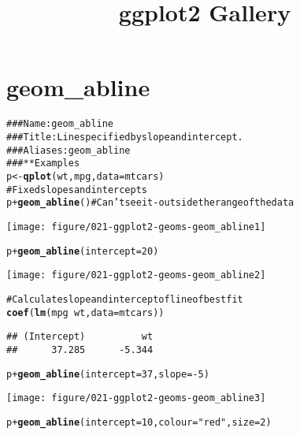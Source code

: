 \documentclass[a4paper,titlepage]{tufte-handout}\usepackage{graphicx, color}
\title{ggplot2 Gallery}
\makeatletter
\def\maxwidth{ %
  \ifdim\Gin@nat@width>\linewidth
    \linewidth
  \else
    \Gin@nat@width
  \fi
}
\newcommand{\hlfunctioncall}[1]{\textcolor[rgb]{0.501960784313725,0,0.329411764705882}{\textbf{#1}}}%
\newcommand{\hlstring}[1]{\textcolor[rgb]{0.6,0.6,1}{#1}}%
\newcommand{\hlcomment}[1]{\textcolor[rgb]{0.180392156862745,0.6,0.341176470588235}{#1}}%
\newenvironment{kframe}{%
 \def\at@end@of@kframe{}%
 \ifinner\ifhmode%
  \def\at@end@of@kframe{\end{minipage}}%
  \begin{minipage}{\columnwidth}%
 \fi\fi%
 \def\FrameCommand##1{\hskip\@totalleftmargin \hskip-\fboxsep
 \colorbox{shadecolor}{##1}\hskip-\fboxsep
     \hskip-\linewidth \hskip-\@totalleftmargin \hskip\columnwidth}%
 \MakeFramed {\advance\hsize-\width
   \@totalleftmargin\z@ \linewidth\hsize
   \@setminipage}}%
 {\par\unskip\endMakeFramed%
 \at@end@of@kframe}
\newenvironment{knitrout}{}{} %
\makeatother
\begin{document}
\maketitle
\tableofcontents







\section{geom\_abline}

\begin{knitrout}
\color{fgcolor}\begin{kframe}
\begin{alltt}
\hlcomment{### Name: geom_abline}
\hlcomment{### Title: Line specified by slope and intercept.}
\hlcomment{### Aliases: geom_abline}
\hlcomment{### ** Examples}
p <- \hlfunctioncall{qplot}(wt, mpg, data = mtcars)
\hlcomment{# Fixed slopes and intercepts}
p + \hlfunctioncall{geom_abline}() \hlcomment{# Can't see it - outside the range of the data}
\end{alltt}
\end{kframe}\texttt{[image: figure/021-ggplot2-geoms-geom\_abline1]} \begin{kframe}\begin{alltt}
p + \hlfunctioncall{geom_abline}(intercept = 20)
\end{alltt}
\end{kframe}\texttt{[image: figure/021-ggplot2-geoms-geom\_abline2]} \begin{kframe}\begin{alltt}
\hlcomment{# Calculate slope and intercept of line of best fit}
\hlfunctioncall{coef}(\hlfunctioncall{lm}(mpg ~ wt, data = mtcars))
\end{alltt}
\begin{verbatim}
## (Intercept)          wt 
##      37.285      -5.344
\end{verbatim}
\begin{alltt}
p + \hlfunctioncall{geom_abline}(intercept = 37, slope = -5)
\end{alltt}
\end{kframe}\texttt{[image: figure/021-ggplot2-geoms-geom\_abline3]} \begin{kframe}\begin{alltt}
p + \hlfunctioncall{geom_abline}(intercept = 10, colour = \hlstring{"red"}, size = 2)

\end{alltt}
\end{kframe}
\end{knitrout}
\end{document}
